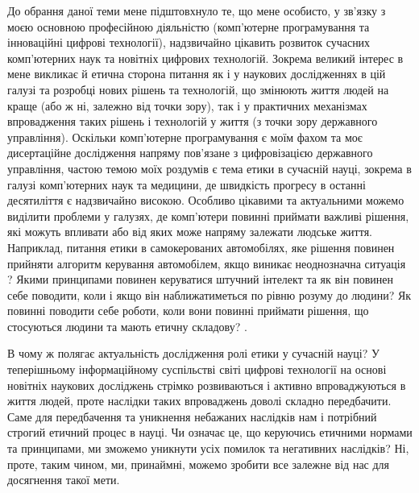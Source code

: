 До обрання даної теми мене підштовхнуло те, що мене особисто, у зв'язку з моєю основною професійною діяльністю (комп'ютерне програмування та інноваційні цифрові технології), надзвичайно цікавить розвиток сучасних комп'ютерних наук та новітніх цифрових технологій. Зокрема великий інтерес в мене викликає й етична сторона питання як і у наукових дослідженнях в цій галузі та розробці нових рішень та технологій, що змінюють життя людей на краще (або ж ні, залежно від точки зору), так і у практичних механізмах впровадження таких рішень і технологій у життя (з точки зору державного управління). Оскільки комп'ютерне програмування є моїм фахом та моє дисертаційне дослідження напряму пов'язане з цифровізацією державного управління, частою темою моїх роздумів є тема етики в сучасній науці, зокрема в галузі комп'ютерних наук та медицини, де швидкість прогресу в останні десятиліття є надзвичайно високою. Особливо цікавими та актуальними можемо виділити проблеми у галузях, де комп'ютери повинні приймати важливі рішення, які можуть впливати або від яких може напряму залежати людське життя. Наприклад, питання етики в самокерованих автомобілях, яке рішення повинен прийняти алгоритм керування автомобілем, якщо виникає неоднозначна ситуація \cite{Nyholm2016}\cite{EthicsSelfDriving}? Якими принципами повинен керуватися штучний інтелект та як він повинен себе поводити, коли і якщо він наближатиметься по рівню розуму до людини? Як повинні поводити себе роботи, коли вони повинні приймати рішення, що стосуються людини та мають етичну складову? \cite{bostrom2018ethics}\cite{sep-ethics-ai}.

В чому ж полягає актуальність дослідження ролі етики у сучасній науці? У теперішньому інформаційному суспільстві світі цифрові технології на основі новітніх наукових досліджень стрімко розвиваються і активно впроваджуються в життя людей, проте наслідки таких впроваджень доволі складно передбачити. Саме для передбачення та уникнення небажаних наслідків нам і потрібний строгий етичний процес в науці. Чи означає це, що керуючись етичними нормами та принципами, ми зможемо уникнути усіх помилок та негативних наслідків? Ні, проте, таким чином, ми, принаймні, можемо зробити все залежне від нас для досягнення такої мети.